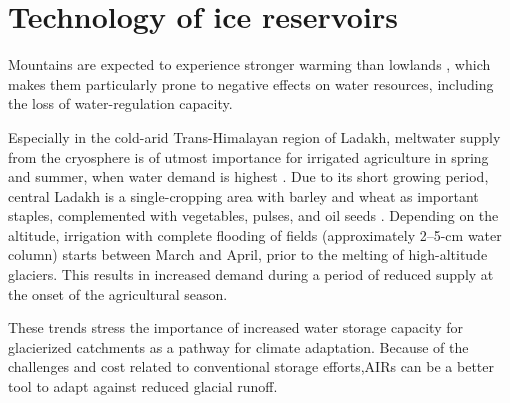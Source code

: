 \chapter{Technology of ice reservoirs}
\label{chap:tech}


Mountains are expected to experience stronger warming than lowlands
\citep{ragettliContrastingClimateChange2016}, which makes them particularly prone to negative effects on
water resources, including the loss of water-regulation capacity.

Especially in the cold-arid Trans-Himalayan region of Ladakh, meltwater supply from the cryosphere is of utmost
importance for irrigated agriculture in spring and summer, when water demand is highest
\citep{nusserCryosphereFedIrrigationNetworks2019}. Due to its short growing period, central Ladakh is a
single-cropping area with barley and wheat as important staples, complemented with vegetables, pulses, and oil
seeds \citep{nusserSociohydrologyArtificialGlaciers2019}. Depending on the altitude, irrigation with complete
flooding of fields (approximately 2–5-cm water column) starts between March and April, prior to the melting of
high-altitude glaciers. This results in increased demand during a period of reduced supply at the onset of the
agricultural season.

These trends stress the importance of increased water storage capacity for glacierized catchments as a pathway
for climate adaptation. Because of the challenges and cost related to conventional storage efforts,\ac{AIRs} can be
a better tool to adapt against reduced glacial runoff. 





